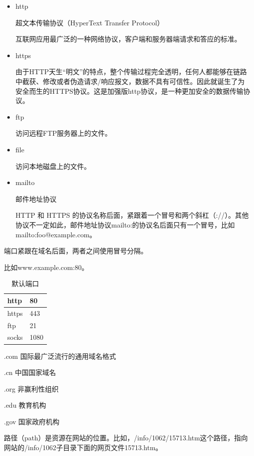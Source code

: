 \begin{itemize}
    \item http
    
    超文本传输协议（HyperText Transfer Protocol）

    互联网应用最广泛的一种网络协议，客户端和服务器端请求和答应的标准。
    \item https
    
    由于HTTP天生“明文”的特点，整个传输过程完全透明，任何人都能够在链路中截获、修改或者伪造请求/响应报文，数据不具有可信性。因此就诞生了为安全而生的HTTPS协议。这是加强版http协议，是一种更加安全的数据传输协议。
    \item ftp
    
    访问远程FTP服务器上的文件。
    \item file
    
    访问本地磁盘上的文件。
    \item mailto
    
    邮件地址协议
    
    HTTP 和 HTTPS 的协议名称后面，紧跟着一个冒号和两个斜杠（://）。其他协议不一定如此，邮件地址协议mailto:的协议名后面只有一个冒号，比如 mailto:foo@example.com。
\end{itemize}

{\bfseries {}}

端口紧跟在域名后面，两者之间使用冒号分隔。

比如www.example.com:80。

\begin{table}[ht]
    \caption{默认端口}
    \centering
    \label{tab:my-table}
    \begin{tabular}{|l|l|}
        \hline
        http & 80 \\ \hline
    https & 443 \\ \hline
    ftp & 21 \\ \hline
    socks & 1080 \\ \hline
    \end{tabular}
    \end{table}

{\bfseries {}}

.com 国际最广泛流行的通用域名格式

.cn 中国国家域名

.org 非赢利性组织

.edu 教育机构

.gov 国家政府机构


{\bfseries {}}

路径（path）是资源在网站的位置。比如，/info/1062/15713.htm这个路径，指向网站的/info/1062子目录下面的网页文件15713.htm。

